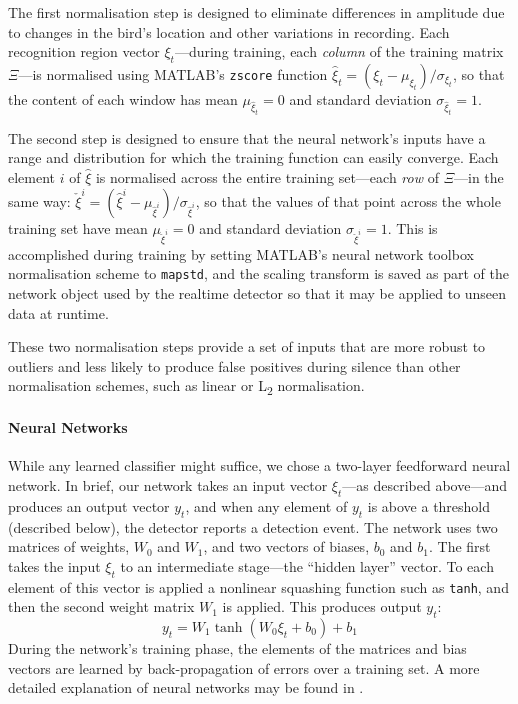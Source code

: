 \documentclass[10pt,letterpaper]{article}
\renewcommand{\subsubsection}[1]{\paragraph{#1}}
\begin{document}
The first normalisation step is designed to eliminate differences in
amplitude due to changes in the bird's location and other variations
in recording.  Each recognition region vector $\xi_t$---during
training, each {\em column} of the training matrix $\Xi$---is
normalised using MATLAB's {\tt zscore} function $\hat{\xi}_t = (\xi_t
- \mu_{\xi_t}) / \sigma_{\xi_t}$, so that the content of each window
has mean $\mu_{\hat{\xi}_t}=0$ and standard deviation
$\sigma_{\hat{\xi}_t}=1$.

The second step is designed to ensure that the neural network's inputs
have a range and distribution for which the training function can
easily converge.  Each element $i$ of $\hat{\xi}$ is normalised across
the entire training set---each {\em row} of $\Xi$---in the same way:
$\check{\xi}^i = (\hat{\xi}^i -
\mu_{\hat{\xi}^i})/\sigma_{\hat{\xi}^i}$, so that the values of that
point across the whole training set have mean $\mu_{\check{\xi}^i}=0$
and standard deviation $\sigma_{\check{\xi}^i}=1$.  This is
accomplished during training by setting MATLAB's neural network
toolbox normalisation scheme to {\tt mapstd}, and the scaling
transform is saved as part of the network object used by the realtime
detector so that it may be applied to unseen data at runtime.

These two normalisation steps provide a set of inputs that are more
robust to outliers and less likely to produce false positives during
silence than other normalisation schemes, such as linear or
L\textsubscript{2} normalisation.

\subsubsection{Neural Networks}

While any learned classifier might suffice, we chose a two-layer
feedforward neural network.  In brief, our network takes an input
vector $\xi_t$---as described above---and produces an output vector
$y_t$, and when any element of $y_t$ is above a threshold (described
below), the detector reports a detection event.  The network uses two
matrices of weights, $W_0$ and $W_1$, and two vectors of biases, $b_0$
and $b_1$.  The first takes the input $\xi_t$ to an intermediate
stage---the ``hidden layer'' vector.  To each element of this vector
is applied a nonlinear squashing function such as {\tt tanh}, and then
the second weight matrix $W_1$ is applied.  This produces output
$y_t$:
\begin{equation*}
  y_t = W_1 \tanh (W_0 \xi_t + b_0) + b_1
\end{equation*}
During the network's training phase, the elements of the matrices and bias vectors are learned by back-propagation of errors
over a training set.  A more detailed explanation of neural networks
may be found in \cite{hkp}.
\end{document}
